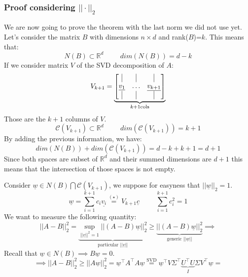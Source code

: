 \subsubsection*{Proof considering $||\cdot||_2$}
We are now going to prove the theorem with the last norm we did not use yet. Let's consider the matrix $B$ with dimensions $n \times d$ and rank($B$)=$k$. This means that:
\[
    N(B) \subset \mathbb{R}^d \hspace{1cm} dim(N(B)) = d-k     
\]
If we consider matrix $V$ of the SVD decomposition of $A$:
\[
    V_{k+1} = \underbrace{\begin{bmatrix}
        \vline & \vline & \vline\\
        \underline{v_1} & \ldots & \underline{v_{k+1}}\\
        \vline & \vline & \vline
    \end{bmatrix}}_{k+1 \text{cols}}
\]
Those are the $k+1$ columns of $V$.
\[
\mathcal{C}(V_{k+1}) \subset \mathbb{R}^d  \hspace{1cm} dim(\mathcal{C}(V_{k+1})) = k+1  
\]
By adding the previous information, we have:
\[
    dim(N(B)) + dim(\mathcal{C}(V_{k+1})) = d - k + k + 1 = d + 1 
\]
Since both spaces are subset of $\mathbb{R}^d$ and their summed dimensions are $d+1$ this means that the intersection of those spaces is not empty.\\ 
\begin{center}
\end{center}
Consider $\underline{w} \in N(B) \bigcap \mathcal{C}(V_{k+1})$, we suppose for easyness that $||\underline{w}||_2 = 1$.
\[
    \underline{w} = \sum_{i=1}^{k+1} c_i \underline{v_i} \overset{(\star)}{=} V_{k+1}\underline{c} \hspace{1cm} \sum_{i=1}^{k+1} c_i^2 = 1   
\]
We want to measure the following quantity:
\[
    ||A - B||^2_2 =  \underbrace{\underset{||\underline{v}||^2=1}{\sup} ||(A-B)\underline{w}||_2^2}_{\text{particular $||\underline{v}||$}} \geq \underbrace{||(A-B)\underline{w}||_2^2}_{\text{generic $||\underline{w}||$}} \implies
\]
Recall that $\underline{w} \in N(B) \implies B\underline{w} = 0$.
\[
    \implies ||A-B||^2_2 \geq ||A\underline{w}||_2^2 = \underline{w}^\intercal A^\intercal A \underline{w} \overset{\text{SVD}}{=} \underline{w}^\intercal V\Sigma^\intercal \underbrace{U^\intercal U}_{I} \Sigma V^\intercal  \underline{w} = 
\] 

